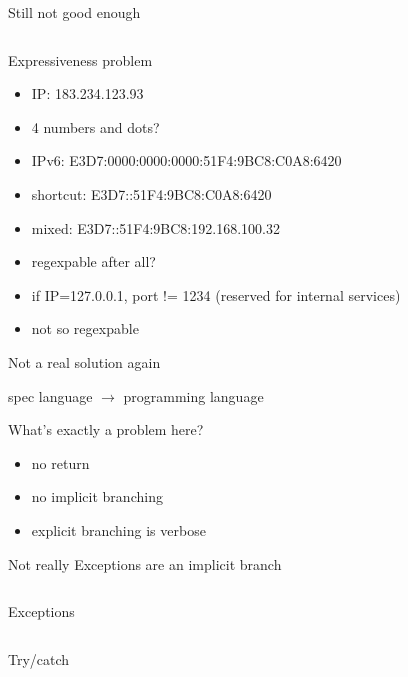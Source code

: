 \documentclass[10pt]{beamer}
\newcommand{\code}[4]{\inputminted[linenos, frame=none, firstline=#2, lastline=#3,
  framesep=10pt, bgcolor=lightgray]{#4}{#1}}
\begin{document}
\begin{frame}{Still not good enough}
  \code{code.erl}{39}{46}{erlang}
\end{frame}

\begin{frame}{Expressiveness problem}
  \begin{itemize}
  \item<1-> IP: 183.234.123.93
  \item<1-> 4 numbers and dots?
  \item<2-> IPv6: E3D7:0000:0000:0000:51F4:9BC8:C0A8:6420
  \item<2-> shortcut: E3D7::51F4:9BC8:C0A8:6420
  \item<2-> mixed: E3D7::51F4:9BC8:192.168.100.32
  \item<2-> regexpable after all?
  \item<3-> if IP=127.0.0.1, port != 1234 (reserved for internal services)
  \item<3-> not so regexpable
  \end{itemize}
\end{frame}

\begin{frame}{Not a real solution again}
  \begin{center}
    \Large
    spec language $\rightarrow$ programming language
  \end{center}
\end{frame}

\begin{frame}{What's exactly a problem here?}
  \begin{itemize}
  \item no return
  \item no implicit branching
  \item explicit branching is verbose
  \end{itemize}
\end{frame}

\begin{frame}{Not really}
  Exceptions are an implicit branch
  \code{code.erl}{48}{50}{erlang}
\end{frame}

\begin{frame}{Exceptions}
  \code{code.erl}{52}{55}{erlang}
\end{frame}

\begin{frame}{Try/catch}
  \code{code.erl}{57}{60}{erlang}
\end{frame}
\end{document}
